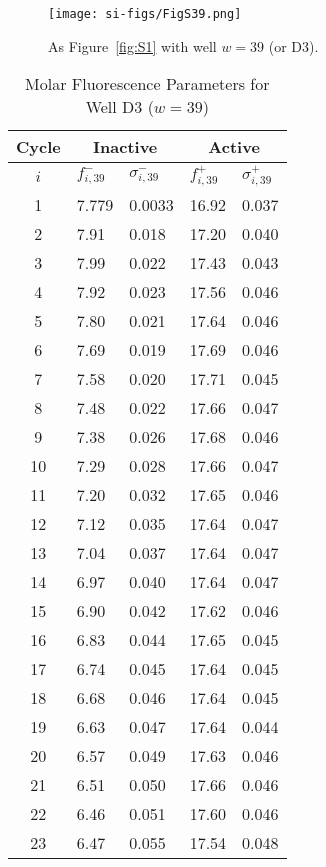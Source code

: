                 \begin{figure}
                    \centering
                    \texttt{[image: si-figs/FigS39.png]}
                    \caption{
                        As Figure~\ref{fig:S1} with well $w=39$ (or D3).
                    }
                \end{figure}
                \clearpage
    \begin{table}
        \caption{Molar Fluorescence Parameters for Well D3 ($w=39$)}
        \centering
        \begin{tabular}{c|ll|ll}
            Cycle & \multicolumn{2}{c|}{Inactive} & \multicolumn{2}{c}{Active} \\
            \hline
            $i$ & $f_{i,39}^{-}$ & $\sigma_{i,39}^{-}$ &  $f_{i,39}^{+}$ & $\sigma_{i,39}^{+}$ \\
            \hline
    1 & 7.779 & 0.0033 & 16.92 & 0.037 \\
2 & 7.91 & 0.018 & 17.20 & 0.040 \\
3 & 7.99 & 0.022 & 17.43 & 0.043 \\
4 & 7.92 & 0.023 & 17.56 & 0.046 \\
5 & 7.80 & 0.021 & 17.64 & 0.046 \\
6 & 7.69 & 0.019 & 17.69 & 0.046 \\
7 & 7.58 & 0.020 & 17.71 & 0.045 \\
8 & 7.48 & 0.022 & 17.66 & 0.047 \\
9 & 7.38 & 0.026 & 17.68 & 0.046 \\
10 & 7.29 & 0.028 & 17.66 & 0.047 \\
11 & 7.20 & 0.032 & 17.65 & 0.046 \\
12 & 7.12 & 0.035 & 17.64 & 0.047 \\
13 & 7.04 & 0.037 & 17.64 & 0.047 \\
14 & 6.97 & 0.040 & 17.64 & 0.047 \\
15 & 6.90 & 0.042 & 17.62 & 0.046 \\
16 & 6.83 & 0.044 & 17.65 & 0.045 \\
17 & 6.74 & 0.045 & 17.64 & 0.045 \\
18 & 6.68 & 0.046 & 17.64 & 0.045 \\
19 & 6.63 & 0.047 & 17.64 & 0.044 \\
20 & 6.57 & 0.049 & 17.63 & 0.046 \\
21 & 6.51 & 0.050 & 17.66 & 0.046 \\
22 & 6.46 & 0.051 & 17.60 & 0.046 \\
23 & 6.47 & 0.055 & 17.54 & 0.048 \\

\end{tabular}
\end{table}
